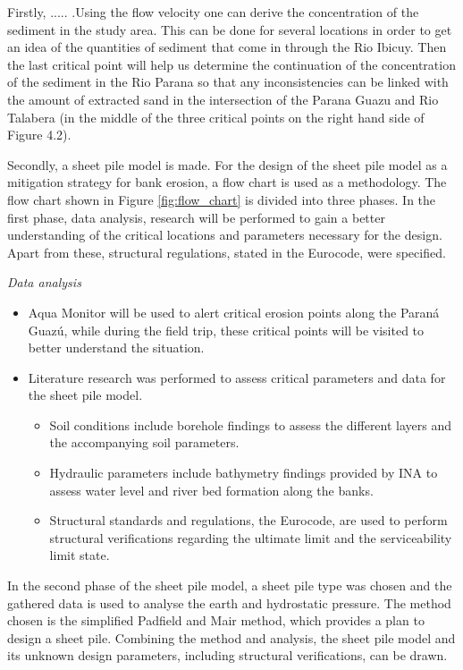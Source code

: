 Firstly, ..... .Using the flow velocity one can derive the concentration of the sediment in the study area. This can be done for several locations in order to get an idea of the quantities of sediment that come in through the Rio Ibicuy. Then the last critical point will help us determine the continuation of the concentration of the sediment in the Rio Parana so that any inconsistencies can be linked with the amount of extracted sand in the intersection of the Parana Guazu and Rio Talabera (in the middle of the three critical points on the right hand side of Figure 4.2).


Secondly, a sheet pile model is made. For the design of the sheet pile model as a mitigation strategy for bank erosion, a flow chart is used as a methodology. The flow chart shown in Figure \ref{fig:flow_chart} is divided into three phases. In the first phase, data analysis, research will be performed to gain a better understanding of the critical locations and parameters necessary for the design. Apart from these, structural regulations, stated in the Eurocode, were specified. 

\textit{Data analysis}

\begin{itemize}
    \item Aqua Monitor will be used to alert critical erosion points along the Paraná Guazú, while during the field trip, these critical points will be visited to better understand the situation.
    \item Literature research was performed to assess critical parameters and data for the sheet pile model.
    \begin{itemize}
        \item Soil conditions include borehole findings to assess the different layers and the accompanying soil parameters.
        \item Hydraulic parameters include bathymetry findings provided by INA to assess water level and river bed formation along the banks.
        \item Structural standards and regulations, the Eurocode, are used to perform structural verifications regarding the ultimate limit and the serviceability limit state.
    \end{itemize}
\end{itemize}   

In the second phase of the sheet pile model, a sheet pile type was chosen and the gathered data is used to analyse the earth and hydrostatic pressure. The method chosen is the simplified Padfield and Mair method, which provides a plan to design a sheet pile. Combining the method and analysis, the sheet pile model and its unknown design parameters, including structural verifications, can be drawn. 

